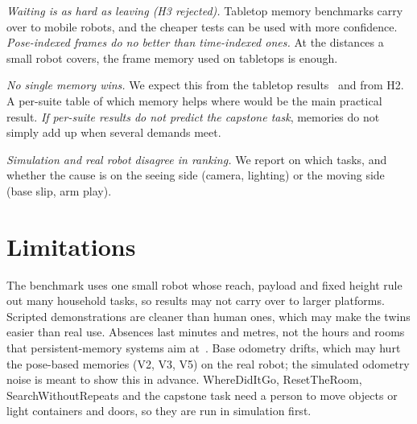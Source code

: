 \documentclass[conference]{IEEEtran}
\begin{document}
\emph{Waiting is as hard as leaving (H3 rejected).} Tabletop memory benchmarks carry over to mobile robots, and the cheaper tests can be used with more confidence. \emph{Pose-indexed frames do no better than time-indexed ones.} At the distances a small robot covers, the frame memory used on tabletops is enough.

\emph{No single memory wins.} We expect this from the tabletop results~\cite{dai2026robomme} and from H2. A per-suite table of which memory helps where would be the main practical result. \emph{If per-suite results do not predict the capstone task}, memories do not simply add up when several demands meet.

\emph{Simulation and real robot disagree in ranking.} We report on which tasks, and whether the cause is on the seeing side (camera, lighting) or the moving side (base slip, arm play).

\section{Limitations}

The benchmark uses one small robot whose reach, payload and fixed height rule out many household tasks, so results may not carry over to larger platforms. Scripted demonstrations are cleaner than human ones, which may make the twins easier than real use. Absences last minutes and metres, not the hours and rooms that persistent-memory systems aim at~\cite{banwasi2026messymem}. Base odometry drifts, which may hurt the pose-based memories (V2, V3, V5) on the real robot; the simulated odometry noise is meant to show this in advance. WhereDidItGo, ResetTheRoom, SearchWithoutRepeats and the capstone task need a person to move objects or light containers and doors, so they are run in simulation first.

\renewcommand{\bibfont}{\footnotesize}
\setlength{\bibsep}{1pt}


\end{document}
